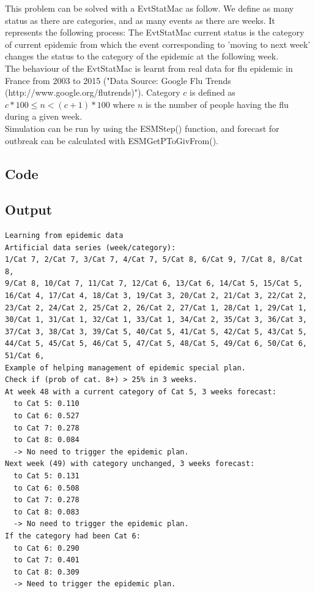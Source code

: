 \documentclass[12pt, a4paper]{article}
\begin{document}
This problem can be solved with a EvtStatMac as follow. We define as many status as there are categories, and as many events as there are weeks. It represents the following process: The EvtStatMac current status is the category of current epidemic from which the event corresponding to 'moving to next week' changes the status to the category of the epidemic at the following week.\\

The behaviour of the EvtStatMac is learnt from real data for flu epidemic in France from 2003 to 2015 ("Data Source: Google Flu Trends (http://www.google.org/flutrends)"). Category $c$ is defined as $c*100\le n<(c+1)*100$ where $n$ is the number of people having the flu during a given week.\\

Simulation can be run by using the {\ttfamily ESMStep()} function, and forecast for outbreak can be calculated with {\ttfamily ESMGetPToGivFrom()}.\\

\subsection{Code}

\begin{scriptsize}
\begin{ttfamily}

\end{ttfamily}
\end{scriptsize}

\subsection{Output}

\begin{scriptsize}
\begin{ttfamily}
\begin{lstlisting}
Learning from epidemic data
Artificial data series (week/category):
1/Cat 7, 2/Cat 7, 3/Cat 7, 4/Cat 7, 5/Cat 8, 6/Cat 9, 7/Cat 8, 8/Cat 8, 
9/Cat 8, 10/Cat 7, 11/Cat 7, 12/Cat 6, 13/Cat 6, 14/Cat 5, 15/Cat 5, 
16/Cat 4, 17/Cat 4, 18/Cat 3, 19/Cat 3, 20/Cat 2, 21/Cat 3, 22/Cat 2, 
23/Cat 2, 24/Cat 2, 25/Cat 2, 26/Cat 2, 27/Cat 1, 28/Cat 1, 29/Cat 1, 
30/Cat 1, 31/Cat 1, 32/Cat 1, 33/Cat 1, 34/Cat 2, 35/Cat 3, 36/Cat 3, 
37/Cat 3, 38/Cat 3, 39/Cat 5, 40/Cat 5, 41/Cat 5, 42/Cat 5, 43/Cat 5, 
44/Cat 5, 45/Cat 5, 46/Cat 5, 47/Cat 5, 48/Cat 5, 49/Cat 6, 50/Cat 6, 
51/Cat 6, 
Example of helping management of epidemic special plan.
Check if (prob of cat. 8+) > 25% in 3 weeks.
At week 48 with a current category of Cat 5, 3 weeks forecast:
  to Cat 5: 0.110
  to Cat 6: 0.527
  to Cat 7: 0.278
  to Cat 8: 0.084
  -> No need to trigger the epidemic plan.
Next week (49) with category unchanged, 3 weeks forecast:
  to Cat 5: 0.131
  to Cat 6: 0.508
  to Cat 7: 0.278
  to Cat 8: 0.083
  -> No need to trigger the epidemic plan.
If the category had been Cat 6:
  to Cat 6: 0.290
  to Cat 7: 0.401
  to Cat 8: 0.309
  -> Need to trigger the epidemic plan.
\end{lstlisting}
\end{ttfamily}
\end{scriptsize}
\end{document}
